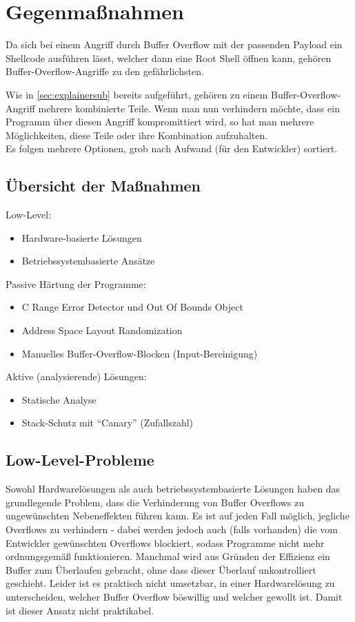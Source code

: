 \pagebreak
\section{Gegenmaßnahmen}
Da sich bei einem Angriff durch Buffer Overflow mit der passenden Payload
ein Shellcode ausführen lässt, welcher dann eine Root Shell
öffnen kann, gehören
Buffer-Overflow-Angriffe zu den gefährlichsten.

Wie in \autoref{sec:explainersub} bereits aufgeführt,
gehören zu einem Buffer-Overflow-Angriff mehrere kombinierte Teile. Wenn
man nun verhindern möchte, dass ein Programm über diesen Angriff kompromittiert wird, 
so hat man mehrere Möglichkeiten, diese Teile oder ihre Kombination aufzuhalten. \cite{Werthmann2006SurveyOB}\\
Es folgen mehrere Optionen, grob nach Aufwand (für den Entwickler) sortiert.
\subsection{Übersicht der Maßnahmen}
Low-Level:
\begin{itemize}
    \item Hardware-basierte Lösungen
    \item Betriebssystembasierte Ansätze
\end{itemize}
Passive Härtung der Programme:
\begin{itemize}
    \item C Range Error Detector und Out Of Bounds Object
    \item Address Space Layout Randomization
    \item Manuelles Buffer-Overflow-Blocken (Input-Bereinigung)
\end{itemize}
Aktive (analysierende) Lösungen:
\begin{itemize}
    \item Statische Analyse
    \item Stack-Schutz mit ``Canary'' (Zufallszahl)
\end{itemize}

\subsection{Low-Level-Probleme}
Sowohl Hardwarelösungen als auch betriebssystembasierte Lösungen haben
das grundlegende Problem, dass die Verhinderung von Buffer Overflows zu
ungewünschten Nebeneffekten führen kann. Es ist auf jeden Fall möglich,
jegliche Overflows zu verhindern - dabei werden jedoch auch (falls vorhanden) die vom
Entwickler gewünschten Overflows blockiert, sodass Programme nicht mehr
ordnungsgemäß funktionieren. Manchmal wird aus Gründen der Effizienz ein
Buffer zum Überlaufen gebracht, ohne dass dieser Überlauf unkontrolliert
geschieht. Leider ist es praktisch nicht umsetzbar, in einer Hardwarelösung
zu unterscheiden, welcher Buffer Overflow böswillig und welcher gewollt ist. 
Damit ist dieser Ansatz nicht praktikabel.
\pagebreak


